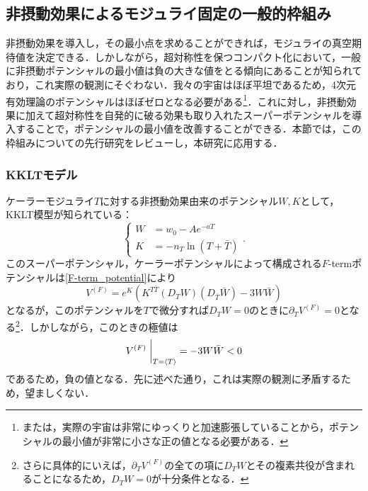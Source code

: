 \documentclass[a4paper,uplatex,dvipdfmx,10pt]{jsarticle}
\theoremstyle{definition}
\begin{document}
\subsection{非摂動効果によるモジュライ固定の一般的枠組み}
\label{review_moduli_stabilize}

非摂動効果を導入し，その最小点を求めることができれば，モジュライの真空期待値を決定できる．しかしながら，超対称性を保つコンパクト化において，一般に非摂動ポテンシャルの最小値は負の大きな値をとる傾向にあることが知られており，これ実際の観測にそぐわない．我々の宇宙はほぼ平坦であるため，4次元有効理論のポテンシャルはほぼゼロとなる必要がある\footnote{
   または，実際の宇宙は非常にゆっくりと加速膨張していることから，ポテンシャルの最小値が非常に小さな正の値となる必要がある．
}．これに対し，非摂動効果に加えて超対称性を自発的に破る効果も取り入れたスーパーポテンシャルを導入することで，ポテンシャルの最小値を改善することができる\cite{Abe_ModuliStabilization_2007a}．本節では，この枠組みについての先行研究をレビューし，本研究に応用する．


\subsubsection*{KKLTモデル}

ケーラーモジュライ$T$に対する非摂動効果由来のポテンシャル$W,K$として，KKLT模型\cite{Kachru_SitterVacua_2003}が知られている：
\begin{equation}
   \left\{
      \begin{alignedat}{1}
         W
         &=
         w_{0}
         -
         Ae^{-aT}
         \\
         K
         &=
         -n_{T}\ln(T+\bar{T})
      \end{alignedat}
   \right.
   .
   \label{potential_KKLT}
\end{equation}
このスーパーポテンシャル，ケーラーポテンシャルによって構成される$F$-termポテンシャルは\eqref{F-term_potential}により
\begin{equation}
   V^{(F)}
   =
   e^{K}
   \left(
      K^{T\bar{T}}(D_{T}W)(D_{\bar{T}}\bar{W})
      -
      3W\bar{W}
   \right)
   \nonumber
\end{equation}
となるが，このポテンシャルを$T$で微分すれば$D_{T}W=0$のときに$\partial_{T}V^{(F)}=0$となる\footnote{
   さらに具体的にいえば，$\partial_{T}V^{(F)}$の全ての項に$D_{T}W$とその複素共役が含まれることになるため，$D_{T}W=0$が十分条件となる．
}．しかしながら，このときの極値は
\begin{equation}
   V^{(F)}
   \left.\vphantom{\frac{1}{2}}\right|_{T=\ev*{T}}
   =
   -3W\bar{W}
   <
   0
\end{equation}
であるため，負の値となる．先に述べた通り，これは実際の観測に矛盾するため，望ましくない．
\end{document}
